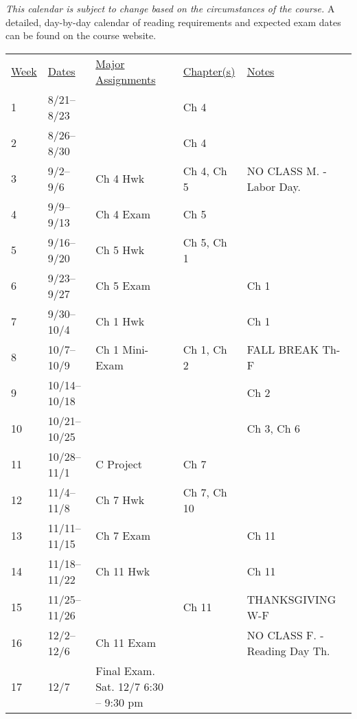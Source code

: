 \documentclass[10pt]{article}
\begin{document}
\textit{This calendar is subject to change based on the circumstances of the course.} A detailed, day-by-day calendar of reading requirements and expected exam dates can be found on the course website.

\begin{center}
\begin{tabular}{lllll}
\underline{Week} & \underline{Dates} & \underline{Major Assignments} & \underline{Chapter(s)} & \underline{Notes} \\
1 & 8/21--8/23  &  & Ch 4 & \\
2 & 8/26--8/30 &  & Ch 4 & \\
3 & 9/2--9/6 & Ch 4 Hwk & Ch 4, Ch 5 & NO CLASS M. - Labor Day. \\
4 & 9/9--9/13  & Ch 4 Exam & Ch 5 &  \\
5 & 9/16--9/20 & Ch 5 Hwk & Ch 5, Ch 1 & \\
6 & 9/23--9/27 & Ch 5 Exam &  & Ch 1\\
7 & 9/30--10/4 & Ch 1 Hwk & & Ch 1 \\
8 & 10/7--10/9 & Ch 1 Mini-Exam & Ch 1, Ch 2 & FALL BREAK Th-F  \\
9 & 10/14--10/18 &  &  & Ch 2\\
10 & 10/21--10/25 &  &  & Ch 3, Ch 6\\
11 & 10/28--11/1 & C Project & Ch 7 &  \\
12 & 11/4--11/8 & Ch 7 Hwk & Ch 7, Ch 10 & \\
13 & 11/11--11/15 & Ch 7 Exam &  & Ch 11 \\
14 & 11/18--11/22 & Ch 11 Hwk & & Ch 11\\
15 & 11/25--11/26 & & Ch 11 & THANKSGIVING W-F \\
16 & 12/2--12/6 & Ch 11 Exam & & NO CLASS F. - Reading Day Th.\\
17 & 12/7 & Final Exam. Sat. 12/7 6:30 -- 9:30 pm & &  \\
\end{tabular}
\end{center}
\end{document}
